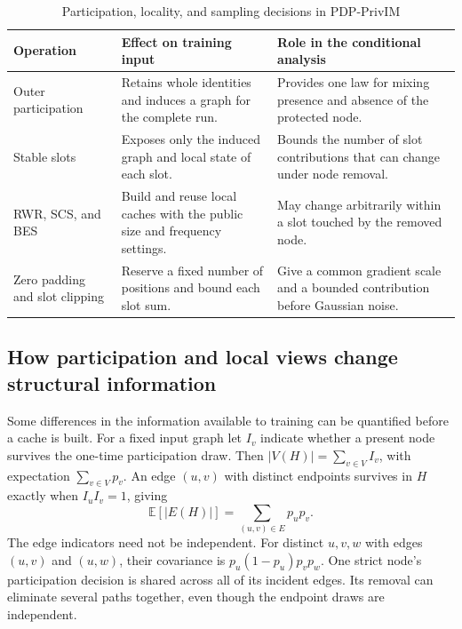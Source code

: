 \begin{table}[htbp]
\centering\small
\caption{Participation, locality, and sampling decisions in PDP-PrivIM}
\label{tab:sampling-design}
\begin{tabularx}{\textwidth}{@{}p{}XX@{}}
\toprule
Operation & Effect on training input & Role in the conditional analysis \\
\midrule
Outer participation & Retains whole identities and induces a graph for the complete run. & Provides one law for mixing presence and absence of the protected node. \\
Stable slots & Exposes only the induced graph and local state of each slot. & Bounds the number of slot contributions that can change under node removal. \\
RWR, SCS, and BES & Build and reuse local caches with the public size and frequency settings. & May change arbitrarily within a slot touched by the removed node. \\
Zero padding and slot clipping & Reserve a fixed number of positions and bound each slot sum. & Give a common gradient scale and a bounded contribution before Gaussian noise. \\
\bottomrule
\end{tabularx}
\end{table}

\subsection{How participation and local views change structural information}
Some differences in the information available to training can be quantified before a cache is built. For a fixed input graph let $I_v$ indicate whether a present node survives the one-time participation draw. Then $|V(H)|=\sum_{v\in V}I_v$, with expectation $\sum_{v\in V}p_v$. An edge $(u,v)$ with distinct endpoints survives in $H$ exactly when $I_u I_v=1$, giving
\begin{equation}
 \mathbb E[|E(H)|]=\sum_{(u,v)\in E}p_up_v.
 \label{eq:expected-retained-edges}
\end{equation}
The edge indicators need not be independent. For distinct $u,v,w$ with edges $(u,v)$ and $(u,w)$, their covariance is $p_u(1-p_u)p_vp_w$. One strict node's participation decision is shared across all of its incident edges. Its removal can eliminate several paths together, even though the endpoint draws are independent.


